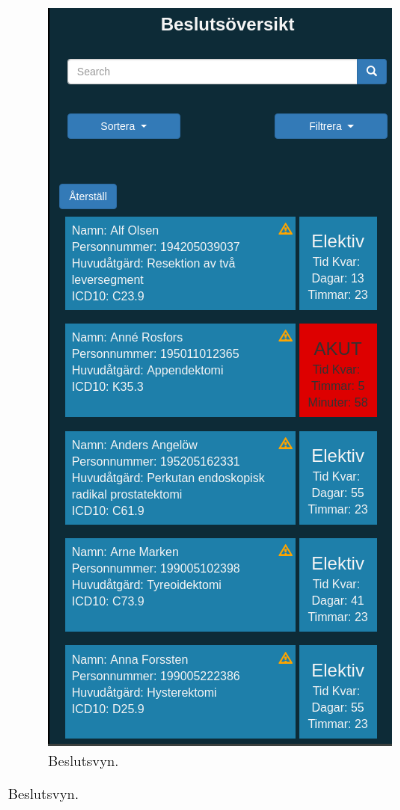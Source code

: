\begin{figure}[H]
\begin{subfigure}[b]{0.4\linewidth}
		\includegraphics[width=\linewidth]{Figures/beslut.png}
		\caption{Beslutsvyn.}
		\label{fig:beslutsvy}

\end{subfigure}
\end{figure}
